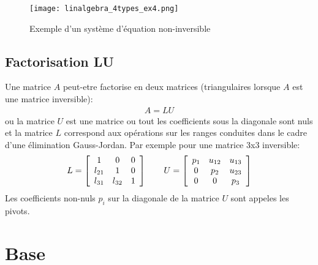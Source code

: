 \begin{example}
\begin{figure}[H]
	\centering
		\texttt{[image: linalgebra\_4types\_ex4.png]}
	\caption{Exemple d'un système d'équation non-inversible}
	\label{fig:rmn_ex4}
\end{figure}
\end{example}


\subsection{Factorisation LU}
\label{sec:lu}

Une matrice $A$ peut-etre factorise en deux matrices (triangulaires lorsque $A$ est une matrice inversible):
%
\begin{align}
A = LU 
\end{align}
%
ou la matrice $U$ est une matrice ou tout les coefficients sous la diagonale sont nuls et la matrice $L$ correspond aux opérations sur les ranges conduites dans le cadre d'une élimination Gauss-Jordan. Par exemple pour une matrice 3x3 inversible:
%
\begin{align}
L= 
\left[ \begin{array}{c c c } 
1      &   0       & 0   \\ 
l_{21} &   1       & 0   \\  
l_{31} & l_{32}    & 1
\end{array} \right]
\quad\quad
U = 
\left[ \begin{array}{c c c c c } 
p_{1} & u_{12} &  u_{13} \\ 
0     & p_{2}  &  u_{23}  \\ 
0     & 0      &  p_{3}
\end{array} \right]
\end{align}
%
Les coefficients non-nuls $p_i$ sur la diagonale de la matrice $U$ sont appeles les pivots.


\newpage
\section{Base}
\label{sec:base}

